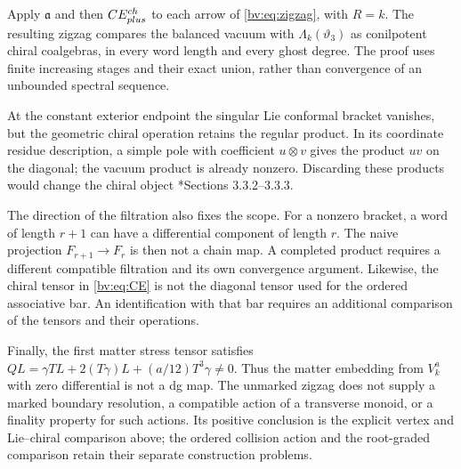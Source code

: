 Apply \(\mathfrak a\) and then \(CE_{plus}^{ch}\) to
each arrow of \eqref{bv:eq:zigzag}, with \(R=k\).  The resulting
zigzag compares the balanced vacuum with
\(\Lambda_k(\vartheta_3)\) as conilpotent chiral coalgebras, in every
word length and every ghost degree.  The proof uses finite increasing
stages and their exact union, rather than convergence of an unbounded
spectral sequence.

At the constant exterior endpoint the singular Lie conformal bracket
vanishes, but the geometric chiral operation retains the regular
product.  In its coordinate residue description, a simple pole with
coefficient \(u\otimes v\) gives the product \(uv\) on the diagonal;
the vacuum product is already nonzero.  Discarding these products
would change the chiral object
\cite{BD04}*{Sections 3.3.2--3.3.3}.

The direction of the filtration also fixes the scope.  For a nonzero
bracket, a word of length \(r+1\) can have a differential component
of length \(r\).  The naive projection \(F_{r+1}\to F_r\) is then
not a chain map.  A completed product requires a different compatible
filtration and its own convergence argument.  Likewise, the chiral
tensor in \eqref{bv:eq:CE} is not the diagonal tensor used for the
ordered associative bar.  An identification with that bar requires
an additional comparison of the tensors and their operations.

Finally, the first matter stress tensor satisfies
\(QL=\gamma TL+2(T\gamma)L+(a/12)T^3\gamma\ne0\).
Thus the matter embedding from \(V_k^a\) with zero differential is
not a dg map.  The unmarked zigzag does not supply a marked boundary
resolution, a compatible action of a transverse monoid, or a finality
property for such actions.  Its positive conclusion is the explicit
vertex and Lie--chiral comparison above; the ordered collision action
and the root-graded comparison retain their separate construction
problems.
